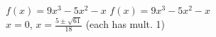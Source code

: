 {$f(x) = 9x^{3} - 5x^{2} - x$}
{$f(x) = 9x^{3} - 5x^{2} - x$ \\ $x = 0$, $x = \frac{5 \pm \sqrt{61}}{18}$ (each has mult. 1)}